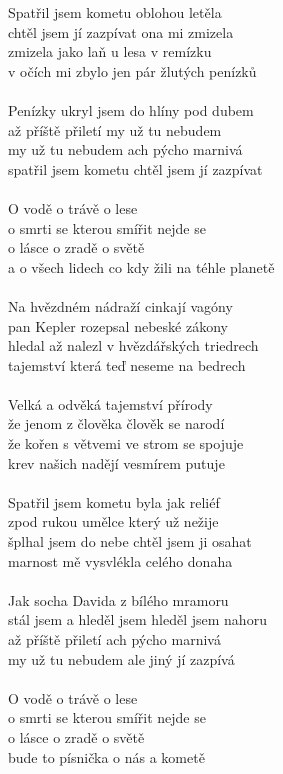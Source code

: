 Spatřil jsem kometu oblohou letěla\\
chtěl jsem jí zazpívat ona mi zmizela\\
zmizela jako laň u lesa v remízku\\
v očích mi zbylo jen pár žlutých penízků\\
\\
Penízky ukryl jsem do hlíny pod dubem\\
až příště přiletí my už tu nebudem\\
my už tu nebudem ach pýcho marnivá\\
spatřil jsem kometu chtěl jsem jí zazpívat\\
\\
O vodě o trávě o lese\\
o smrti se kterou smířit nejde se\\
o lásce o zradě o světě\\
a o všech lidech co kdy žili na téhle planetě\\
\\
Na hvězdném nádraží cinkají vagóny\\
pan Kepler rozepsal nebeské zákony\\
hledal až nalezl v hvězdářských triedrech\\
tajemství která teď neseme na bedrech\\
\\
Velká a odvěká tajemství přírody\\
že jenom z člověka člověk se narodí\\
že kořen s větvemi ve strom se spojuje\\
krev našich nadějí vesmírem putuje\\
\\
Spatřil jsem kometu byla jak reliéf\\
zpod rukou umělce který už nežije\\
šplhal jsem do nebe chtěl jsem ji osahat\\
marnost mě vysvlékla celého donaha\\
\\
Jak socha Davida z bílého mramoru\\
stál jsem a hleděl jsem hleděl jsem nahoru\\
až příště přiletí ach pýcho marnivá\\
my už tu nebudem ale jiný jí zazpívá\\
\\
O vodě o trávě o lese\\
o smrti se kterou smířit nejde se\\
o lásce o zradě o světě\\
bude to písnička o nás a kometě\\
\newpage


